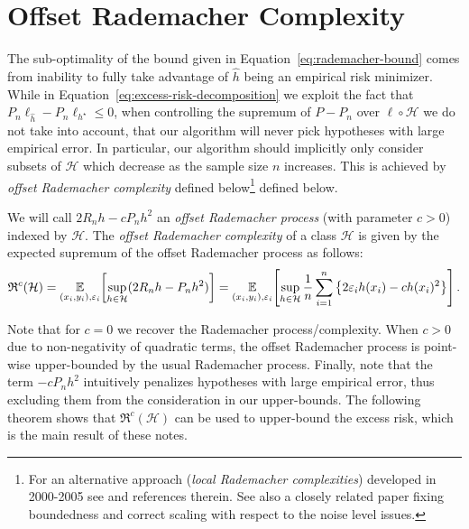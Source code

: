 \documentclass[main.tex]{subfiles}
\begin{document}
\section{Offset Rademacher Complexity}
\label{section:offset-complexity}

The sub-optimality of the bound given in Equation~\eqref{eq:rademacher-bound}
comes from inability to fully take advantage of $\hat{h}$ being an empirical
risk minimizer. While in Equation~\eqref{eq:excess-risk-decomposition} we
exploit the fact that $P_{n}\ell_{\hat{h}} - P_{n}\ell_{h^{\star}} \leq 0$,
when controlling the supremum of $P - P_{n}$ over $\ell \circ \mathcal{H}$
we do not take into account, that our algorithm will never pick hypotheses
with large empirical error. In particular, our algorithm
should implicitly only consider subsets of $\mathcal{H}$ which decrease as
the sample size $n$ increases. This is achieved by \emph{offset Rademacher
  complexity} defined below\footnote{
  For an alternative approach (\emph{local Rademacher complexities})
  developed in 2000-2005 see \citet{bartlett2005local} and references therein.
  See also a closely related paper \citet{mendelson2014learning} fixing
  boundedness and correct scaling with respect to the noise level issues.
} defined below.

\begin{definition}
  We will call $2R_{n}h - cP_{n}h^{2}$ an \emph{offset Rademacher process} (with
  parameter $c > 0$) indexed by $\mathcal{H}$.
  The \emph{offset Rademacher complexity} of a class $\mathcal{H}$ is
  given by the expected supremum of the offset Rademacher process as follows:
  $$
    \mathfrak{R}^{c}(\mathcal{H})
    = \underset{{(x_{i}, y_{i}), \varepsilon_{i}}}{\mathbb{E}}\!\left[{
      \sup_{h \in \mathcal{H}} (2R_{n}h - P_{n}h^{2})
    }\right]
    = \underset{{(x_{i}, y_{i}), \varepsilon_{i}}}{\mathbb{E}}\!\left[{
      \sup_{h \in \mathcal{H}} \frac{1}{n}\sum_{i=1}^{n}
      \left\{ 2\varepsilon_{i}h(x_{i}) - ch(x_{i})^{2}\right\}
    }\right].
  $$
\end{definition}

Note that for $c = 0$ we recover the Rademacher process/complexity.
When $c > 0$ due to non-negativity of quadratic terms, the offset Rademacher
process is point-wise upper-bounded by the usual Rademacher process.
Finally, note that the term $-cP_{n}h^{2}$ intuitively penalizes
hypotheses with large empirical error, thus excluding them from the
consideration in our upper-bounds.
The following theorem shows that $\mathfrak{R}^{c}(\mathcal{H})$ can be
used to upper-bound the excess risk, which is the main result of these notes.
\end{document}
